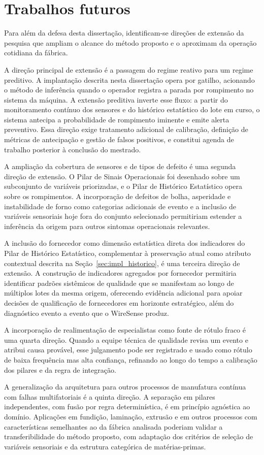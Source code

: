 \section{Trabalhos futuros}
\label{sec:trabalhos_futuros}

Para além da defesa desta dissertação, identificam-se direções de extensão da pesquisa que ampliam o alcance do método proposto e o aproximam da operação cotidiana da fábrica.

A direção principal de extensão é a passagem do regime reativo para um regime preditivo. A implantação descrita nesta dissertação opera por gatilho, acionando o método de inferência quando o operador registra a parada por rompimento no sistema da máquina. A extensão preditiva inverte esse fluxo: a partir do monitoramento contínuo dos sensores e do histórico estatístico do lote em curso, o sistema antecipa a probabilidade de rompimento iminente e emite alerta preventivo. Essa direção exige tratamento adicional de calibração, definição de métricas de antecipação e gestão de falsos positivos, e constitui agenda de trabalho posterior à conclusão do mestrado.

A ampliação da cobertura de sensores e de tipos de defeito é uma segunda direção de extensão. O Pilar de Sinais Operacionais foi desenhado sobre um subconjunto de variáveis priorizadas, e o Pilar de Histórico Estatístico opera sobre os rompimentos. A incorporação de defeitos de bolha, asperidade e instabilidade de forno como categorias adicionais de evento e a inclusão de variáveis sensoriais hoje fora do conjunto selecionado permitiriam estender a inferência da origem para outros sintomas operacionais relevantes.

A inclusão do fornecedor como dimensão estatística direta dos indicadores do Pilar de Histórico Estatístico, complementar à preservação atual como atributo contextual descrita na Seção~\ref{sec:impl_historico}, é uma terceira direção de extensão. A construção de indicadores agregados por fornecedor permitiria identificar padrões sistêmicos de qualidade que se manifestam ao longo de múltiplos lotes da mesma origem, oferecendo evidência adicional para apoiar decisões de qualificação de fornecedores em horizonte estratégico, além do diagnóstico evento a evento que o WireSense produz.

A incorporação de realimentação de especialistas como fonte de rótulo fraco é uma quarta direção. Quando a equipe técnica de qualidade revisa um evento e atribui causa provável, esse julgamento pode ser registrado e usado como rótulo de baixa frequência mas alta confiança, refinando ao longo do tempo a calibração dos pilares e da regra de integração.

A generalização da arquitetura para outros processos de manufatura contínua com falhas multifatoriais é a quinta direção. A separação em pilares independentes, com fusão por regra determinística, é em princípio agnóstica ao domínio. Aplicações em fundição, laminação, extrusão e em outros processos com características semelhantes ao da fábrica analisada poderiam validar a transferibilidade do método proposto, com adaptação dos critérios de seleção de variáveis sensoriais e da estrutura categórica de matérias-primas.
